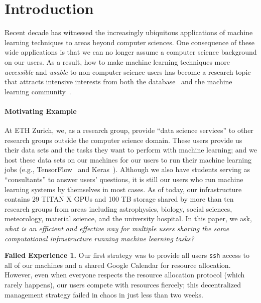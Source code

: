\documentclass[letterpaper]{vldb}
\begin{document}
\section{Introduction}\label{sec:introduction}

Recent decade has witnessed the increasingly 
ubiquitous applications of machine learning techniques 
to areas beyond computer sciences. 
One consequence of these wide applications
is that we can no longer assume a computer science 
background on our users. As a result, how to make
machine learning techniques more {\em accessible} and
{\em usable} to non-computer science users has become
a research topic that attracts intensive interests
from both the database~\cite{XXX,XXX,XXX,XXX,XXX}
and the machine learning community~\cite{XXX,XXX,XXX,XXX,XXX}.

\paragraph*{Motivating Example} At ETH Zurich,
we, as a research group, provide ``data science
services'' to other research groups outside the computer science domain.
These users provide
us their data sets and the tasks they 
want to perform with machine learning; and
we host these data sets on our machines
for our users to run their machine learning
jobs (e.g.,
TensorFlow~\cite{XXX} and Keras~\cite{XXX}).
Although we also have students serving as ``consultants''
to answer users' questions, it is still our
users who run machine learning systems
by themselves in most cases. As of today, our infrastructure
contains 29 TITAN X GPUs and 100 TB storage
shared by more than ten research groups
from areas including astrophysics,
biology, social sciences, meteorology, 
material science, and the university hospital.
In this paper, we ask, {\em what is an
efficient and effective way for multiple users sharing 
the same computational infrastructure running
machine learning tasks?}

\vspace{0.5em}
\noindent
{\bf Failed Experience 1.} Our first strategy was to provide
all users \texttt{ssh} access to all of our machines
and a shared Google Calendar for resource allocation.
However, even when everyone respects the resource allocation
protocol (which rarely happens), our users compete with 
resources fiercely; this decentralized management strategy failed in chaos in just less than two weeks. 
\end{document}
